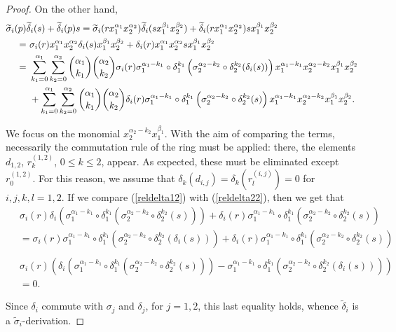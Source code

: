 \documentclass{amsart}
\theoremstyle{definition}
\theoremstyle{remark}
\numberwithin{equation}{section}
\begin{document}
\begin{proof}
On the other hand,
{\footnotesize{
    \begin{align}
\widetilde{\sigma}_i(p) & \widetilde{\delta}_i(s) + \widetilde{\delta}_i(p)s =  \widetilde{\sigma}_i(rx_1^{\alpha_{1}}x_2^{\alpha_{2}})\widetilde{\delta}_i(sx_1^{\beta_{1}}x_2^{\beta_{2}})+\widetilde{\delta}_i(rx_1^{\alpha_{1}}x_2^{\alpha_{2}})sx_1^{\beta_{1}}x_2^{\beta_{2}} \notag \\
    = &\ \sigma_i(r)x_1^{\alpha_{1}}x_2^{\alpha_{2}}\delta_i(s)x_1^{\beta_{1}}x_2^{\beta_{2}}+\delta_i(r)x_1^{\alpha_{1}}x_2^{\alpha_{2}}sx_1^{\beta_{1}}x_2^{\beta_{2}} \notag \\
    = &\ \sum_{k_1=0}^{\alpha_{1}}\sum_{k_2=0}^{\alpha_{2}}\binom{\alpha_{1}}{k_1}\binom{\alpha_{2}}{k_2}\sigma_i(r)\sigma_1^{\alpha_{1}-k_1}\circ\delta_1^{k_1}\left(\sigma_2^{\alpha_{2}-k_2}\circ\delta_2^{k_2}(\delta_i(s))\right)x_1^{\alpha_{1}-k_1}x_2^{\alpha_{2}-k_2}x_1^{\beta_{1}}x_2^{\beta_{2}} \notag \\
    &\ + \sum_{k_1=0}^{\alpha_{1}}\sum_{k_2=0}^{\alpha_{2}}\binom{\alpha_{1}}{k_1}\binom{\alpha_{2}}{k_2}\delta_i(r)\sigma_1^{\alpha_{1}-k_1}\circ\delta_1^{k_1}\left(\sigma_2^{\alpha_{2}-k_2}\circ\delta_2^{k_2}(s)\right)x_1^{\alpha_{1}-k_1}x_2^{\alpha_{2}-k_2}x_1^{\beta_{1}}x_2^{\beta_{2}} \label{reldelta22}.
    \end{align}
}}

We focus on the monomial $x_2^{\alpha_2-k_2}x_1^{\beta_1}$. With the aim of comparing the terms, necessarily the commutation rule of the ring must be applied: there, the elements $d_{1,2}$,  $r_k^{(1,2)}$, $0 \leq k \leq 2$, appear. As expected, these must be eliminated except $r_0^{(1,2)}$. For this reason, we assume that $\delta_k(d_{i,j})=\delta_k(r_l^{(i,j)})=0$ for $i, j, k, l= 1, 2$. If we compare {\rm (}\ref{reldelta12}{\rm )} with {\rm (}\ref{reldelta22}{\rm )}, then we get that 
\begin{align*}
    &\ \sigma_i(r)\delta_i\left(\sigma_1^{\alpha_{1}-k_1}\circ\delta_1^{k_1}\left(\sigma_2^{\alpha_{2}-k_2}\circ\delta_2^{k_2}(s)\right)\right)+\delta_i(r)\sigma_1^{\alpha_{1}-k_1}\circ\delta_1^{k_1}\left(\sigma_2^{\alpha_{2}-k_2}\circ\delta_2^{k_2}(s)\right) \\
    &\ = \sigma_i(r)\sigma_1^{\alpha_{1}-k_1}\circ\delta_1^{k_1}\left(\sigma_2^{\alpha_{2}-k_2}\circ\delta_2^{k_2}(\delta_i(s))\right) + \delta_i(r)\sigma_1^{\alpha_{1}-k_1}\circ\delta_1^{k_1}\left(\sigma_2^{\alpha_{2}-k_2}\circ\delta_2^{k_2}(s)\right) \\
\end{align*}
\begin{align*}
    &\ \sigma_i(r)\left(\delta_i\left(\sigma_1^{\alpha_{1}-k_1}\circ\delta_1^{k_1}\left(\sigma_2^{\alpha_{2}-k_2}\circ\delta_2^{k_2}(s)\right)\right)-\sigma_1^{\alpha_{1}-k_1}\circ\delta_1^{k_1}\left(\sigma_2^{\alpha_{2}-k_2}\circ\delta_2^{k_2}(\delta_i(s))\right)\right) \\
    &\ = 0.
\end{align*}

Since $\delta_i$ commute with $\sigma_j$ and $\delta_j$, for $j=1, 2$, this last equality holds, whence $\widetilde{\delta}_i$ is a $\widetilde{\sigma}_i$-derivation.
\end{proof}
\end{document}
